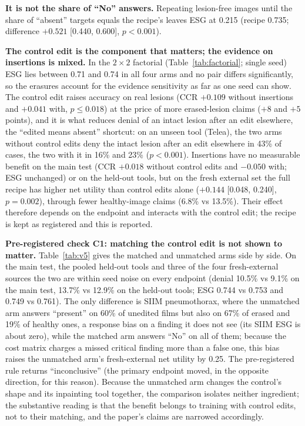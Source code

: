 \documentclass[11pt]{article}
\begin{document}
\textbf{It is not the share of ``No'' answers.} Repeating lesion-free images until the share of ``absent'' targets equals the recipe's leaves ESG at 0.215 (recipe 0.735; difference $+0.521$ [0.440, 0.600], $p<0.001$).

\textbf{The control edit is the component that matters; the evidence on insertions is mixed.} In the $2\times2$ factorial (Table~\ref{tab:factorial}; single seed) ESG lies between 0.71 and 0.74 in all four arms and no pair differs significantly, so the erasures account for the evidence sensitivity as far as one seed can show. The control edit raises accuracy on real lesions (CCR $+0.109$ without insertions and $+0.041$ with, $p\le0.018$) at the price of more erased-lesion claims ($+8$ and $+5$ points), and it is what reduces denial of an intact lesion after an edit elsewhere, the ``edited means absent'' shortcut: on an unseen tool (Telea), the two arms without control edits deny the intact lesion after an edit elsewhere in 43\% of cases, the two with it in 16\% and 23\% ($p<0.001$). Insertions have no measurable benefit on the main test (CCR $+0.018$ without control edits and $-0.050$ with; ESG unchanged) or on the held-out tools, but on the fresh external set the full recipe has higher net utility than control edits alone ($+0.144$ [0.048, 0.240], $p=0.002$), through fewer healthy-image claims (6.8\% vs 13.5\%). Their effect therefore depends on the endpoint and interacts with the control edit; the recipe is kept as registered and this is reported.

\textbf{Pre-registered check C1: matching the control edit is not shown to matter.}\label{sec:v5} Table~\ref{tab:v5} gives the matched and unmatched arms side by side. On the main test, the pooled held-out tools and three of the four fresh-external sources the two are within seed noise on every endpoint (denial 10.5\% vs 9.1\% on the main test, 13.7\% vs 12.9\% on the held-out tools; ESG 0.744 vs 0.753 and 0.749 vs 0.761). The only difference is SIIM pneumothorax, where the unmatched arm answers ``present'' on 60\% of unedited films but also on 67\% of erased and 19\% of healthy ones, a response bias on a finding it does not see (its SIIM ESG is about zero), while the matched arm answers ``No'' on all of them; because the cost matrix charges a missed critical finding more than a false one, this bias raises the unmatched arm's fresh-external net utility by 0.25. The pre-registered rule returns ``inconclusive'' (the primary endpoint moved, in the opposite direction, for this reason). Because the unmatched arm changes the control's shape and its inpainting tool together, the comparison isolates neither ingredient; the substantive reading is that the benefit belongs to training with control edits, not to their matching, and the paper's claims are narrowed accordingly.
\end{document}
